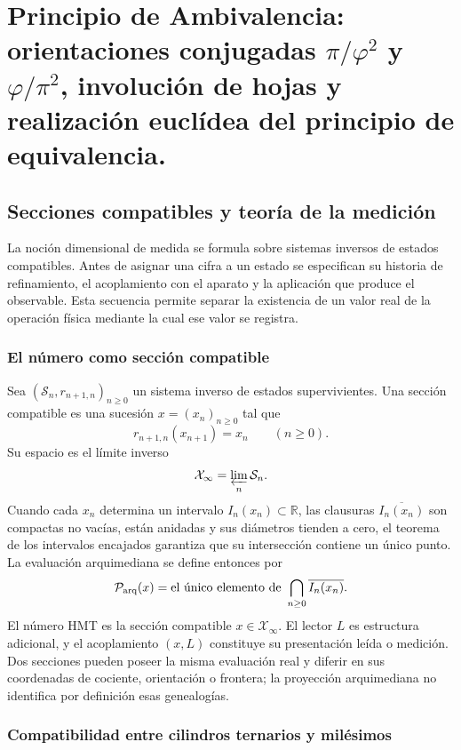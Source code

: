 \chapter{Principio de Ambivalencia: orientaciones conjugadas \texorpdfstring{\(\pi/\varphi^2\)}{π/φ²} y \texorpdfstring{\(\varphi/\pi^2\)}{φ/π²}, involución de hojas y realización euclídea del principio de equivalencia.}
\label{chap:83-16}

\section{Secciones compatibles y teoría de la medición}
\label{p12-83-c16-s1:chap:medida}

La noción dimensional de medida se formula sobre sistemas inversos de estados
compatibles. Antes de asignar una cifra a un estado se especifican su historia
de refinamiento, el acoplamiento con el aparato y la aplicación que produce el
observable. Esta secuencia permite separar la existencia de un valor real de
la operación física mediante la cual ese valor se registra.

\subsection{El número como sección compatible}

Sea \((\mathcal S_n,r_{n+1,n})_{n\geq0}\) un sistema inverso de estados
supervivientes. Una sección compatible es una sucesión
\(x=(x_n)_{n\geq0}\) tal que
\[
 r_{n+1,n}(x_{n+1})=x_n
 \qquad(n\geq0).
\]
Su espacio es el límite inverso
\[
 \mathcal X_\infty=\varprojlim_n\mathcal S_n.
\]
Cuando cada \(x_n\) determina un intervalo \(I_n(x_n)\subset\mathbb R\), las
clausuras \(\overline{I_n(x_n)}\) son compactas no vacías, están anidadas y
sus diámetros tienden a cero, el teorema de los intervalos encajados garantiza
que su intersección contiene un único punto. La evaluación arquimediana se
define entonces por
\[
 \mathcal P_{\rm arq}(x)
 =\text{el único elemento de }
   \bigcap_{n\geq0}\overline{I_n(x_n)}.
\]
El número HMT es la sección compatible
\(x\in\mathcal X_\infty\). El lector \(L\) es estructura adicional, y el
acoplamiento \((x,L)\) constituye su presentación leída o medición. Dos
secciones pueden poseer la misma evaluación real y diferir en sus coordenadas
de cociente, orientación o frontera; la proyección arquimediana no identifica
por definición esas genealogías.

\subsection{Compatibilidad entre cilindros ternarios y milésimos}

